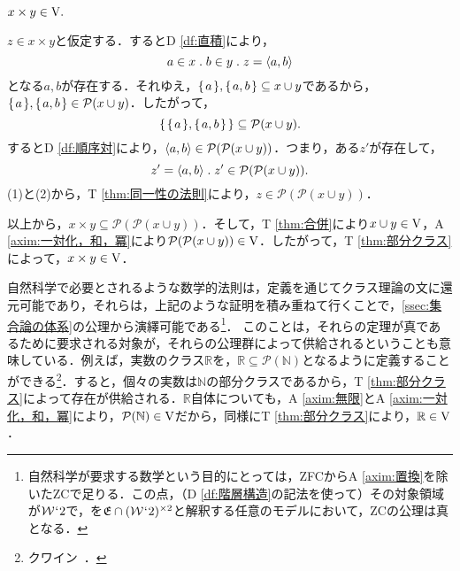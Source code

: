\begin{thm}[直積]
\label{thm:直積}
$
    x\times y\in\mathrm{V}.
$
\end{thm}
\setcounter{equation}{0}
\begin{pf}
    $ z\in x\times y $と仮定する．するとD \ref{df:直積}により，
    \begin{equation}
        a\in x\con{1}b\in y\con{1}z = \orp{a,b}
    \end{equation}
    となる$a,b$が存在する．それゆえ，$ \{\mspace{2mu}a\mspace{2mu}\},\{\mspace{2mu}a,b\mspace{2mu}\}\subseteq x\cup y $であるから，$ \{\mspace{2mu}a\mspace{2mu}\},\{\mspace{2mu}a,b\mspace{2mu}\}\in\mathcal{P}(x\cup y)$．したがって，
    \[
        \{\mspace{2mu}\{\mspace{2mu}a\mspace{2mu}\},\{\mspace{2mu}a,b\mspace{2mu}\}\mspace{2mu}\}\subseteq\mathcal{P}(x\cup y).
    \]
    するとD \ref{df:順序対}により，$ \langle a,b \rangle\in\mathcal{P}(\mathcal{P}(x\cup y)) $．つまり，ある$ z' $が存在して，
    \begin{equation}
        z'=\orp{a,b}\con{1}z'\in \mathcal{P}(\mathcal{P}(x\cup y)).
    \end{equation}
    (1)と(2)から，T \ref{thm:同一性の法則}により，$ z\in\mathcal{P}(\mathcal{P}(x\cup y)) $．

    以上から，$ x\times y\subseteq \mathcal{P}(\mathcal{P}(x\cup y)) $．そして，T \ref{thm:合併}により$x\cup y\in\mathrm{V}$，A \ref{axim:一対化，和，冪}により$\mathcal{P}(\mathcal{P}(x\cup y))\in\mathrm{V}$．したがって，T \ref{thm:部分クラス}によって，$x\times y\in\mathrm{V}$．
\end{pf}

自然科学で必要とされるような数学的法則は，定義を通じてクラス理論の文に還元可能であり，それらは，上記のような証明を積み重ねて行くことで，\ref{ssec:集合論の体系}の公理から演繹可能である\footnote{
    自然科学が要求する数学という目的にとっては，ZFCからA \ref{axim:置換}を除いたZCで足りる．この点，（D \ref{df:階層構造}の記法を使って）その対象領域が$\mathcal{W}{\mspace{1mu}{`}\mspace{1mu}} 2$で，\kagi{$ \in $}を$ \mathfrak{E}\cap(\mathcal{W}{\mspace{1mu}{`}\mspace{1mu}} 2)^{\times 2} $と解釈する任意のモデルにおいて，ZCの公理は真となる．
}．
このことは，それらの定理が真であるために要求される対象が，それらの公理群によって供給されるということも意味している．例えば，実数のクラス$\mathbb{R}$を，$ \mathbb{R}\subseteq\mathcal{P}(\mathbb{N}) $となるように定義することができる\footnote{
    クワイン~\cite[pp.\,113--117]{クワインa}．
}．すると，個々の実数は$\mathbb{N}$の部分クラスであるから，T \ref{thm:部分クラス}によって存在が供給される．$\mathbb{R}$自体についても，A \ref{axim:無限}とA \ref{axim:一対化，和，冪}により，$ \mathcal{P}(\mathbb{N})\in\mathrm{V} $だから，同様にT \ref{thm:部分クラス}により，$ \mathbb{R}\in\mathrm{V} $．

